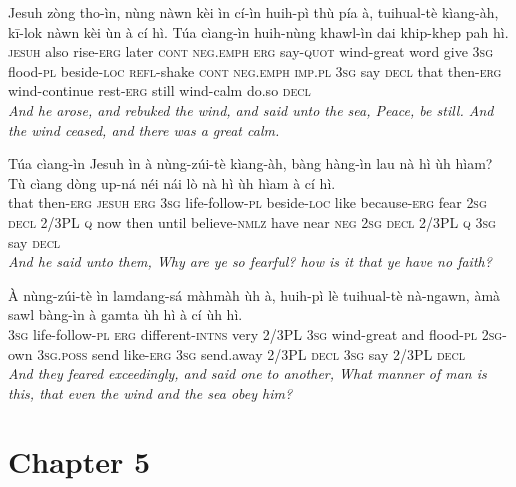 \documentclass[11pt,a4paper]{article}
\begin{document}
\begin{exe}
\gll Jesuh zòng tho-ìn, nùng nàwn kèi ìn cí-ìn huih-pì thù pía à, tuihual-tè kìang-àh, kī-lok nàwn kèi ùn à cí hì. Túa cìang-ìn huih-nùng khawl-ìn dai khip-khep pah hì. \\
     \textsc{jesuh} also rise-\textsc{erg} later \textsc{cont} \textsc{neg}.\textsc{emph} \textsc{erg} say-\textsc{quot} wind-great word give \textsc{3sg} flood-\textsc{pl} beside-\textsc{loc} \textsc{refl}-shake \textsc{cont} \textsc{neg}.\textsc{emph} \textsc{imp}.\textsc{pl} \textsc{3sg} say \textsc{decl} that then-\textsc{erg} wind-continue rest-\textsc{erg} still wind-calm do.so \textsc{decl} \\
\glt \textcolor{kjvcolor}{\textit{And he arose, and rebuked the wind, and said unto the sea, Peace, be still. And the wind ceased, and there was a great calm.}}

\gll Túa cìang-ìn Jesuh ìn à nùng-zúi-tè kìang-àh, bàng hàng-ìn lau nà hì ùh hìam? Tù cìang dòng up-ná néi nái lò nà hì ùh hìam à cí hì. \\
     that then-\textsc{erg} \textsc{jesuh} \textsc{erg} \textsc{3sg} life-follow-\textsc{pl} beside-\textsc{loc} like because-\textsc{erg} fear \textsc{2sg} \textsc{decl} 2/3PL \textsc{q} now then until believe-\textsc{nmlz} have near \textsc{neg} \textsc{2sg} \textsc{decl} 2/3PL \textsc{q} \textsc{3sg} say \textsc{decl} \\
\glt \textcolor{kjvcolor}{\textit{And he said unto them, Why are ye so fearful? how is it that ye have no faith?}}

\gll À nùng-zúi-tè ìn lamdang-sá màhmàh ùh à, huih-pì lè tuihual-tè nà-ngawn, àmà sawl bàng-ìn à gamta ùh hì à cí ùh hì. \\
     \textsc{3sg} life-follow-\textsc{pl} \textsc{erg} different-\textsc{intns} very 2/3PL \textsc{3sg} wind-great and flood-\textsc{pl} \textsc{2sg}-own \textsc{3sg}.\textsc{poss} send like-\textsc{erg} \textsc{3sg} send.away 2/3PL \textsc{decl} \textsc{3sg} say 2/3PL \textsc{decl} \\
\glt \textcolor{kjvcolor}{\textit{And they feared exceedingly, and said one to another, What manner of man is this, that even the wind and the sea obey him?}}

\end{exe}
\newpage

\section*{Chapter 5}
\end{document}
